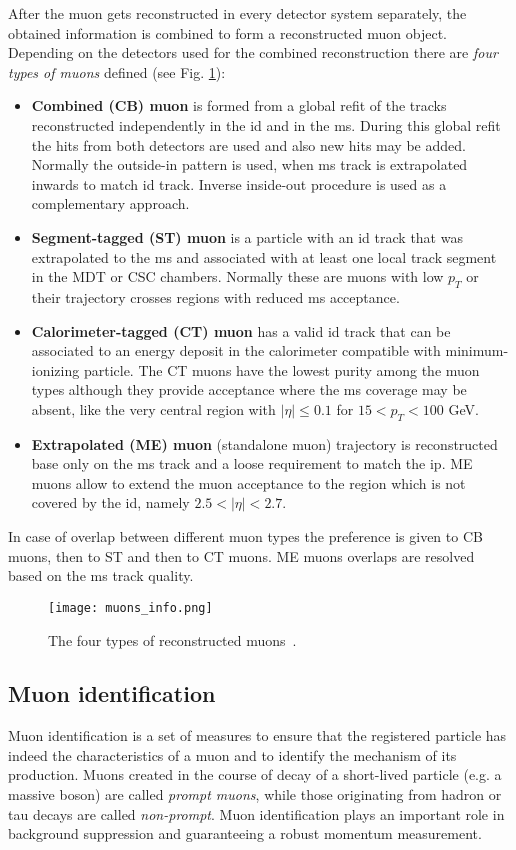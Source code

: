     After the muon gets reconstructed in every detector system separately, the obtained information is combined to form a reconstructed muon object. Depending on the detectors used for the combined reconstruction there are \textit{four types of muons} defined (see Fig. \ref{fig::muon_combined}):
    \begin{itemize}
	\item \textbf{Combined (CB) muon} is formed from a global refit of the tracks reconstructed independently in the \gls{id} and in the \gls{ms}. During this global refit the hits from both detectors are used and also new hits may be added. Normally the outside-in pattern is used, when \gls{ms} track is extrapolated inwards to match \gls{id} track. Inverse inside-out procedure is used as a complementary approach.
	\item \textbf{Segment-tagged (ST) muon} is a particle with an \gls{id} track that was extrapolated to the \gls{ms} and associated with at least one local track segment in the MDT or CSC chambers. Normally these are muons with low $p_T$ or their trajectory crosses regions with reduced \gls{ms} acceptance.
	\item \textbf{Calorimeter-tagged (CT) muon} has a valid \gls{id} track that can be associated to an energy deposit in the calorimeter compatible with minimum-ionizing particle. The CT muons have the lowest purity among the muon types although they provide acceptance where the \gls{ms} coverage may be absent, like the very central region with $|\eta| \le 0.1$ for $15<p_T<100$ GeV. 
	\item \textbf{Extrapolated (ME) muon} (standalone muon) trajectory is reconstructed base only on the \gls{ms} track and a loose requirement to match the \gls{ip}. ME muons allow to extend the muon acceptance to the region which is not covered by the \gls{id}, namely $2.5<|\eta| < 2.7$.
	\end{itemize}
	In case of overlap between different muon types the preference is given to CB muons, then to ST and then to CT muons. ME muons overlaps are resolved based on the \gls{ms} track quality.
      \begin{figure}[htbp]
	\centering
	\texttt{[image: muons\_info.png]}
	\caption[Muon reconstruction]{The four types of reconstructed muons~\cite{muons_reco1}.}
	\label{fig::muon_combined}
	\end{figure}
     \subsection{Muon identification}
     Muon identification is a set of measures to ensure that the registered particle has indeed the characteristics of a muon and to identify the mechanism of its production. Muons created in the course of decay of a short-lived particle (e.g. a massive boson) are called \textit{prompt muons}, while those originating from hadron or tau decays are called \textit{non-prompt}. Muon identification plays an important role in background suppression and guaranteeing a robust momentum measurement.
     
